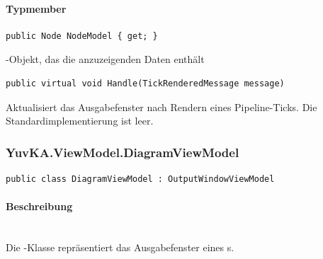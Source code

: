 \paragraph{Typmember}
\begin{itemize}

	\begin{verbatim}
public Node NodeModel { get; }
	\end{verbatim}
	-Objekt, das die anzuzeigenden Daten enthält	

	\begin{verbatim}
public virtual void Handle(TickRenderedMessage message)
	\end{verbatim}
	Aktualisiert das Ausgabefenster nach Rendern eines Pipeline-Ticks. Die Standardimplementierung ist leer.

\end{itemize}

\subsubsection{YuvKA.ViewModel.DiagramViewModel}

\begin{verbatim}
public class DiagramViewModel : OutputWindowViewModel
\end{verbatim}

\paragraph{Beschreibung}~\\
Die -Klasse repräsentiert das Ausgabefenster eines s.

